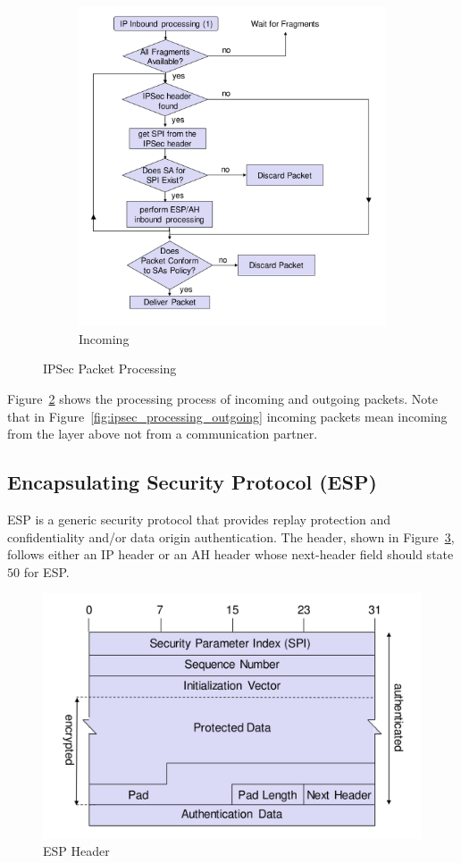 \begin{figure}[H]
\begin{subfigure}{.4\textwidth}
    \includegraphics[width=\textwidth]{figures/ipsec_processing_incoming.png}
    \caption{Incoming}\label{fig:ipsec_processing_incoming}
  \end{subfigure}
  \caption{IPSec Packet Processing}\label{fig:ipsec_processing}
\end{figure}
Figure~\ref{fig:ipsec_processing} shows the processing process of incoming and outgoing packets.
Note that in Figure~\ref{fig:ipsec_processing_outgoing} incoming packets mean incoming from the layer above not from a communication partner.

\subsection{Encapsulating Security Protocol (ESP)}
ESP is a generic security protocol that provides replay protection and confidentiality and/or data origin authentication.
The header, shown in Figure~\ref{fig:esp_header}, follows either an IP header or an AH header whose next-header field should state $50$ for ESP\@.
\begin{figure}[h]
  \centering
  \includegraphics[width=.7\textwidth]{figures/esp_header.png}
  \caption{ESP Header}\label{fig:esp_header}
\end{figure}

